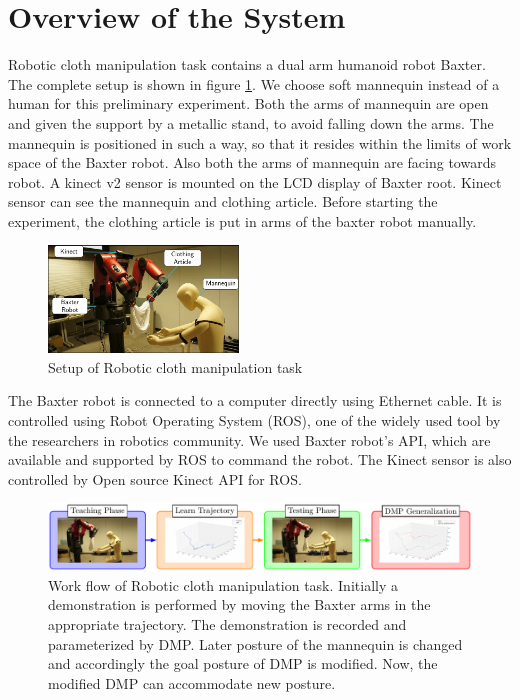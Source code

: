 \documentclass[sigconf]{acmart}
\begin{document}
\section{Overview of the System}
Robotic cloth manipulation task contains a dual arm humanoid robot Baxter. The complete setup is shown in figure \ref{setup}. We choose soft mannequin instead of a human for this preliminary experiment. Both the arms of mannequin are open and  given the support by a metallic stand, to avoid falling down the arms. The mannequin is positioned in such a way, so that it resides within the limits of work space of the Baxter robot. Also both the arms of mannequin are facing towards robot. A kinect v2 sensor is mounted on the LCD display of Baxter root. Kinect sensor can see the mannequin and clothing article. Before starting the experiment, the clothing article is put in arms of the baxter robot manually.

\begin{figure}
	\includegraphics[width=0.45\textwidth]{setup}
	\caption{Setup of Robotic cloth manipulation task}
	\label{setup}
\end{figure}

The Baxter robot is connected to a computer directly using Ethernet cable. It is controlled using Robot Operating System (ROS), one of the widely used tool by the researchers in robotics community. We used Baxter robot's API, which are available and supported by ROS \cite{fitzgerald2013developing} to command the robot. The Kinect sensor is also controlled by Open source Kinect API for ROS.

\begin{figure}
	\includegraphics[width=\textwidth]{flowchart_conf}
	\caption{Work flow of Robotic cloth manipulation task. Initially a demonstration is performed by moving the Baxter arms in the appropriate trajectory. The demonstration is recorded and parameterized by DMP. Later posture of the mannequin is changed and accordingly the goal posture of DMP is modified. Now, the modified DMP can accommodate new posture.}
	\label{workflow}
\end{figure}
\end{document}
